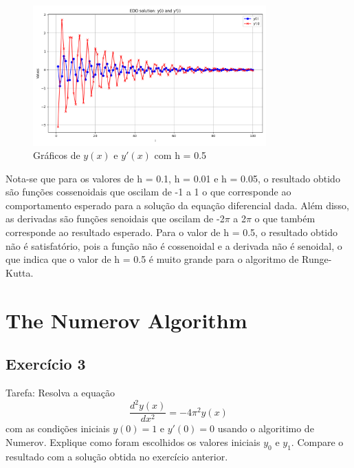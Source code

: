 \documentclass[12pt, a4paper]{article} %
\begin{document}
        \begin{figure}[H]
            \centering
            \includegraphics[width=0.8\textwidth]{../images/results-ex-2-3.png}
            \caption{Gr\'aficos de $y(x)$ e $y'(x)$ com h = 0.5}
        \end{figure}

        Nota-se que para os valores de h = 0.1, h = 0.01 e h = 0.05, o resultado obtido s\~ao fun\c{c}\~oes cossenoidais que oscilam de -1 a 1 o que corresponde ao comportamento esperado para a solu\c{c}\~ao da equa\c{c}\~ao diferencial dada. Al\'em disso, as derivadas s\~ao fun\c{c}\~oes senoidais que oscilam de -2$\pi$ a 2$\pi$ o que tamb\'em corresponde ao resultado esperado. Para o valor de h = 0.5, o resultado obtido n\~ao \'e satisfat\'orio, pois a fun\c{c}\~ao n\~ao \'e cossenoidal e a derivada n\~ao \'e senoidal, o que indica que o valor de h = 0.5 \'e muito grande para o algoritmo de Runge-Kutta.

\section{The Numerov Algorithm}

    \subsection{Exerc\'icio 3}

        Tarefa: Resolva a equa\c{c}\~ao
        \begin{equation*}
            \frac{d^{2}y(x)}{dx^{2}} = -4\pi^{2}y(x)
        \end{equation*}
        com as condi\c{c}\~oes iniciais $y(0) = 1$ e $y'(0) = 0$ usando o algoritimo de Numerov. Explique como foram escolhidos os valores iniciais $y_{0}$ e $y_{1}$. Compare o resultado com a solu\c{c}\~ao obtida no exerc\'icio anterior.

\end{document}
